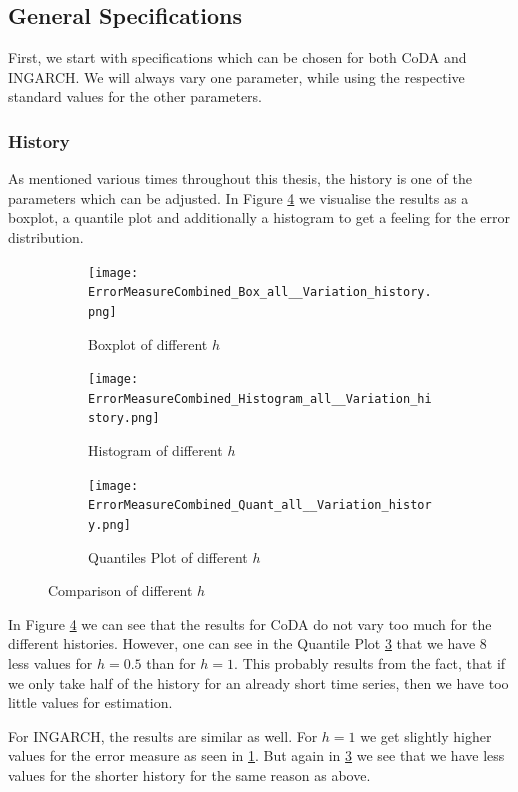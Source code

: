 \subsection{General Specifications}
\label{sec:General Specifications}

First, we start with specifications which can be chosen for both CoDA and INGARCH. We will always vary one parameter, while using the respective standard values for the other parameters. 
\subsubsection{History}
\label{sec:History}

As mentioned various times throughout this thesis, the history is one of the parameters which can be adjusted. In Figure \ref{fig:History Comp1} we visualise the results as a boxplot, a quantile plot  and additionally a histogram to get a feeling for the error distribution. 

\begin{figure}[htb!]
\centering
\begin{subfigure}[b]{0.4\textwidth}
\texttt{[image: ErrorMeasureCombined\_Box\_all\_\_Variation\_history.png]}
\caption{Boxplot of different $h$}
\label{fig:History Box}
\end{subfigure}
\hfill
\begin{subfigure}[b]{0.4\textwidth}
\texttt{[image: ErrorMeasureCombined\_Histogram\_all\_\_Variation\_history.png]}
\caption{Histogram of different $h$}
\label{fig:History Hist}
\end{subfigure}
\hfill
\begin{subfigure}[b]{0.6\textwidth}
\texttt{[image: ErrorMeasureCombined\_Quant\_all\_\_Variation\_history.png]}
\caption{Quantiles Plot of different $h$}
\label{fig:History Quant}
\end{subfigure}
\caption{Comparison of different $h$}
\label{fig:History Comp1}
\end{figure}

In Figure \ref{fig:History Comp1} we can see that the results for CoDA do not vary too much for the different histories. However, one can see in the Quantile Plot \ref{fig:History Quant} that we have 8 less values for  $h=0.5$ than for $h=1$. This probably results from the fact, that if we only take half of the history for an already short time series, then we have too little values for estimation. 

For INGARCH, the results are similar as well. For $h=1$ we get slightly higher values for the error measure as seen in \ref{fig:History Box}. But again in \ref{fig:History Quant} we see that we have less values for the shorter history for the same reason as above. 

